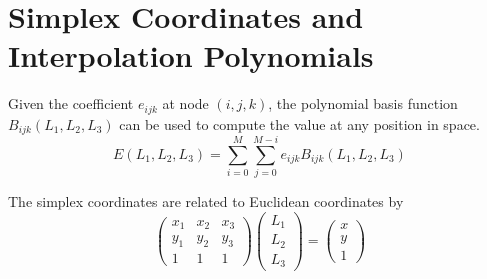 \documentclass[main]{subfiles}
\begin{document}
\section{Simplex Coordinates and Interpolation Polynomials}
\label{Simplex Coordinates and Interpolation Polynomials}
Given the coefficient $e_{ijk}$ at node $(i,j,k)$, the polynomial basis 
function $B_{ijk}(L_1,L_2,L_3)$ can be used to compute the value at any 
position in space.
\begin{equation*}
	E(L_1,L_2,L_3)=\sum\limits_{i=0}^M\sum\limits_{j=0}^{M-i}
	e_{ijk}B_{ijk}(L_1,L_2,L_3)
\end{equation*}

The simplex coordinates are related to Euclidean coordinates by
\begin{equation*}
	\begin{pmatrix}
		x_1 & x_2 & x_3	\\
		y_1 & y_2 & y_3	\\
		1   & 1   & 1
	\end{pmatrix}
	\begin{pmatrix}
		L_1 \\ L_2 \\ L_3
	\end{pmatrix}
	=
	\begin{pmatrix}
		x \\ y \\ 1
	\end{pmatrix}
\end{equation*}
\end{document}
